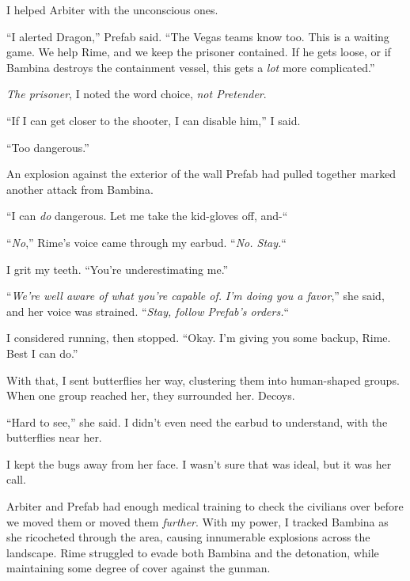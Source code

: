 I helped Arbiter with the unconscious ones.



``I alerted Dragon,'' Prefab said.  ``The Vegas teams know too.  This is a waiting game.  We help Rime, and we keep the prisoner contained.  If he gets loose, or if Bambina destroys the containment vessel, this gets a \emph{lot} more complicated.''



\emph{The prisoner}, I noted the word choice, \emph{not Pretender}.



``If I can get closer to the shooter, I can disable him,'' I said.



``Too dangerous.''



An explosion against the exterior of the wall Prefab had pulled together marked another attack from Bambina.



``I can \emph{do} dangerous.  Let me take the kid-gloves off, and-``



``\emph{No},'' Rime's voice came through my earbud.  ``\emph{No.  Stay.}``



I grit my teeth.  ``You're underestimating me.''



``\emph{We're well aware of what you're capable of.  }\emph{I'm doing you a favor},'' she said, and her voice was strained.  ``\emph{Stay, follow Prefab's orders.}``



I considered running, then stopped.  ``Okay.  I'm giving you some backup, Rime.  Best I can do.''



With that, I sent butterflies her way, clustering them into human-shaped groups.  When one group reached her, they surrounded her.  Decoys.



``Hard to see,'' she said.  I didn't even need the earbud to understand, with the butterflies near her.



I kept the bugs away from her face.  I wasn't sure that was ideal, but it was her call.



Arbiter and Prefab had enough medical training to check the civilians over before we moved them or moved them \emph{further}.  With my power, I tracked Bambina as she ricocheted through the area, causing innumerable explosions across the landscape.  Rime struggled to evade both Bambina and the detonation, while maintaining some degree of cover against the gunman.



